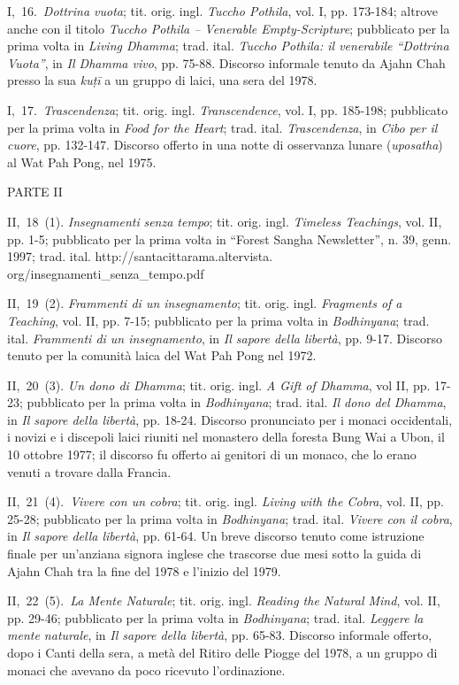 I,~16.~\emph{Dottrina vuota}; tit. orig. ingl. \emph{Tuccho Pothila},
vol. I, pp. 173-184; altrove anche con il titolo \emph{Tuccho Pothila --
Venerable Empty-Scripture}; pubblicato per la prima volta in
\emph{Living Dhamma}; trad. ital. \emph{Tuccho Pothila: il venerabile
``Dottrina Vuota''}, in \emph{Il Dhamma vivo}, pp. 75-88. Discorso
informale tenuto da Ajahn Chah presso la sua \emph{kuṭī} a un gruppo di
laici, una sera del 1978.

I,~17.~\emph{Trascendenza}; tit. orig. ingl. \emph{Transcendence}, vol.
I, pp. 185-198; pubblicato per la prima volta in \emph{Food for the
Heart}; trad. ital. \emph{Trascendenza}, in \emph{Cibo per il cuore},
pp. 132-147. Discorso offerto in una notte di osservanza lunare
(\emph{uposatha}) al Wat Pah Pong, nel 1975.

PARTE II

II,~18~(1). \emph{Insegnamenti} \emph{senza tempo}; tit. orig. ingl.
\emph{Timeless Teachings}, vol. II, pp. 1-5; pubblicato per la prima
volta in ``Forest Sangha Newsletter'', n. 39, genn. 1997; trad. ital.
http://santacittarama.altervista.\\
org/insegnamenti\_senza\_tempo.pdf

II,~19~(2). \emph{Frammenti di un insegnamento}; tit. orig. ingl.
\emph{Fragments of a Teaching}, vol. II, pp. 7-15; pubblicato per la
prima volta in \emph{Bodhinyana}; trad. ital. \emph{Frammenti di un
insegnamento}, in \emph{Il sapore della libertà}, pp. 9-17. Discorso
tenuto per la comunità laica del Wat Pah Pong nel 1972.

II,~20~(3). \emph{Un dono di Dhamma}; tit. orig. ingl. \emph{A Gift of
Dhamma}, vol II, pp. 17-23; pubblicato per la prima volta in
\emph{Bodhinyana}; trad. ital. \emph{Il dono del Dhamma}, in \emph{Il
sapore della libertà}, pp. 18-24. Discorso pronunciato per i monaci
occidentali, i novizi e i discepoli laici riuniti nel monastero della
foresta Bung Wai a Ubon, il 10 ottobre 1977; il discorso fu offerto ai
genitori di un monaco, che lo erano venuti a trovare dalla Francia.

II,~21~(4).~\emph{Vivere con un cobra}; tit. orig. ingl. \emph{Living
with the Cobra}, vol. II, pp. 25-28; pubblicato per la prima volta in
\emph{Bodhinyana}; trad. ital. \emph{Vivere con il cobra}, in \emph{Il
sapore della libertà}, pp. 61-64. Un breve discorso tenuto come
istruzione finale per un'anziana signora inglese che trascorse due mesi
sotto la guida di Ajahn Chah tra la fine del 1978 e l'inizio del 1979.

II,~22~(5).~\emph{La Mente Naturale}; tit. orig. ingl. \emph{Reading the
Natural Mind}, vol. II, pp. 29-46; pubblicato per la prima volta in
\emph{Bodhinyana}; trad. ital. \emph{Leggere la mente naturale}, in
\emph{Il sapore della libertà}, pp. 65-83. Discorso informale offerto,
dopo i Canti della sera, a metà del Ritiro delle Piogge del 1978, a un
gruppo di monaci che avevano da poco ricevuto l'ordinazione.


